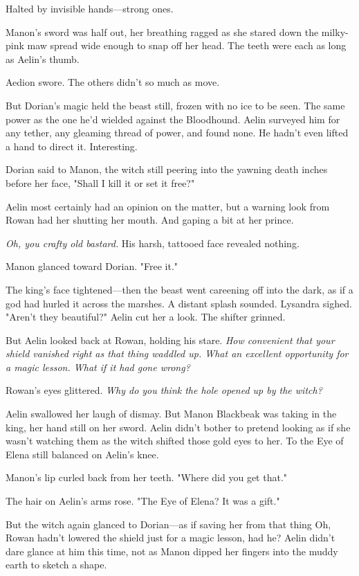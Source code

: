 Halted by invisible hands---strong ones.

Manon's sword was half out, her breathing ragged as she stared down the milky-pink maw spread wide enough to snap off her head.
The teeth were each as long as Aelin's thumb.

Aedion swore.
The others didn't so much as move.

But Dorian's magic held the beast still, frozen with no ice to be seen.
The same power as the one he'd wielded against the Bloodhound.
Aelin surveyed him for any tether, any gleaming thread of power, and found none.
He hadn't even lifted a hand to direct it.
Interesting.

Dorian said to Manon, the witch still peering into the yawning death inches before her face, "Shall I kill it or set it free?"

Aelin most certainly had an opinion on the matter, but a warning look from Rowan had her shutting her mouth.
And gaping a bit at her prince.

\emph{Oh, you crafty old bastard.} His harsh, tattooed face revealed nothing.

Manon glanced toward Dorian.
"Free it."

The king's face tightened---then the beast went careening off into the dark, as if a god had hurled it across the marshes.
A distant splash sounded.
Lysandra sighed.
"Aren't they beautiful?"
Aelin cut her a look.
The shifter grinned.

But Aelin looked back at Rowan, holding his stare.
\emph{How convenient that your shield vanished right as that thing waddled up.
What an excellent opportunity for a magic lesson.
What if it had gone wrong?}

Rowan's eyes glittered.
\emph{Why do you think the hole opened up by the witch?}

Aelin swallowed her laugh of dismay.
But Manon Blackbeak was taking in the king, her hand still on her sword.
Aelin didn't bother to pretend looking as if she wasn't watching them as the witch shifted those gold eyes to her.
To the Eye of Elena still balanced on Aelin's knee.

Manon's lip curled back from her teeth.
"Where did you get that."

The hair on Aelin's arms rose.
"The Eye of Elena?
It was a gift."

But the witch again glanced to Dorian---as if saving her from that thing  Oh, Rowan hadn't lowered the shield just for a magic lesson, had he?
Aelin didn't dare glance at him this time, not as Manon dipped her fingers into the muddy earth to sketch a shape.

